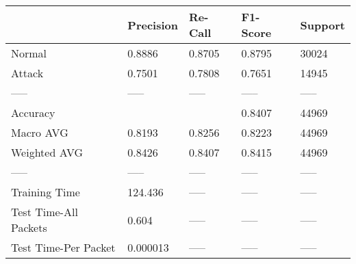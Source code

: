 \begin{tabular}{lllll}
\toprule
{} & Precision & Re-Call & F1-Score & Support \\
\midrule
Normal                &    0.8886 &  0.8705 &   0.8795 &   30024 \\
Attack                &    0.7501 &  0.7808 &   0.7651 &   14945 \\
-----                 &     ----- &   ----- &    ----- &   ----- \\
Accuracy              &           &         &   0.8407 &   44969 \\
Macro AVG             &    0.8193 &  0.8256 &   0.8223 &   44969 \\
Weighted AVG          &    0.8426 &  0.8407 &   0.8415 &   44969 \\
-----                 &     ----- &   ----- &    ----- &   ----- \\
Training Time         &   124.436 &   ----- &    ----- &   ----- \\
Test Time-All Packets &     0.604 &   ----- &    ----- &   ----- \\
Test Time-Per Packet  &  0.000013 &   ----- &    ----- &   ----- \\
\bottomrule
\end{tabular}
